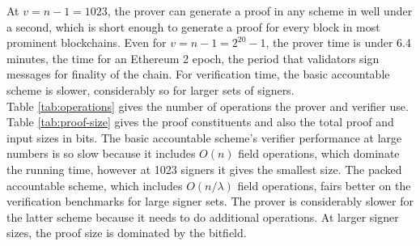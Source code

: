 \noindent At $v = n-1 = 1023$, the prover can generate a proof in any scheme in well under a second, which is short enough to generate a proof for every block in most prominent blockchains. Even for $v= n-1 =2^{20}-1$, the prover time is under 6.4 minutes, the time for an Ethereum 2 epoch, the period that validators sign messages for finality of the chain. For verification time, the basic accountable scheme is slower, considerably so for larger sets of signers. \\

\noindent  Table \ref{tab:operations} gives the number of operations the prover and verifier use. Table \ref{tab:proof-size} gives the proof constituents and also the total proof and input sizes in bits. The basic accountable scheme's verifier performance at large numbers is so slow because it includes $O(n)$ field operations, which dominate the running time, however at 1023 signers it gives the smallest size. The packed accountable scheme, which includes $O(n/\lambda)$ field operations, fairs better on the verification benchmarks for large signer sets. The prover is considerably slower for the latter scheme because it needs to do additional operations. At larger signer sizes, the proof size  is dominated by the bitfield.

